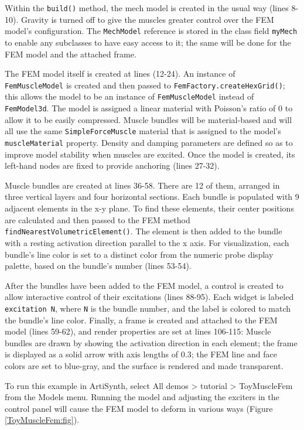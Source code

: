 Within the {\tt build()} method, the mech model is created in the usual way
(lines 8-10). Gravity is turned off to give the muscles greater control over
the FEM model's configuration. The {\tt MechModel} reference is stored in the
class field {\tt myMech} to enable any subclasses to have easy access to it;
the same will be done for the FEM model and the attached frame.

The FEM model itself is created at lines (12-24). An instance of {\tt
FemMuscleModel} is created and then passed to {\tt FemFactory.createHexGrid()};
this allows the model to be an instance of {\tt FemMuscleModel} instead of {\tt
FemModel3d}.  The model is assigned a linear material with Poisson's ratio of 0
to allow it to be easily compressed. Muscle bundles will be material-based and
will all use the same {\tt SimpleForceMuscle} material that is assigned to the
model's {\tt muscleMaterial} property. Density and damping parameters are
defined so as to improve model stability when muscles are excited.  Once the
model is created, its left-hand nodes are fixed to provide anchoring (lines
27-32).

Muscle bundles are created at lines 36-58. There are 12 of them, arranged in
three vertical layers and four horizontal sections. Each bundle is populated
with 9 adjacent elements in the x-y plane. To find these elements, their center
positions are calculated and then passed to the FEM method {\tt
findNearestVolumetricElement()}. The element is then added to the bundle with a
resting activation direction parallel to the x axis. For visualization, each
bundle's line color is set to a distinct color from the numeric probe display
palette, based on the bundle's number (lines 53-54).

After the bundles have been added to the FEM model, a control is created to
allow interactive control of their excitations (lines 88-95). Each widget is
labeled {\tt excitation N}, where {\tt N} is the bundle number, and the label
is colored to match the bundle's line color.  Finally, a frame is created and
attached to the FEM model (lines 59-62), and render properties are set at lines
106-115: Muscle bundles are drawn by showing the activation direction in each
element; the frame is displayed as a solid arrow with axis lengths of 0.3; the
FEM line and face colors are set to blue-gray, and the surface is rendered and
made transparent.

To run this example in ArtiSynth, select {\sf All demos > tutorial >
ToyMuscleFem} from the {\sf Models} menu. Running the model and adjusting the
exciters in the control panel will cause the FEM model to deform in various
ways (Figure \ref{ToyMuscleFem:fig}).

